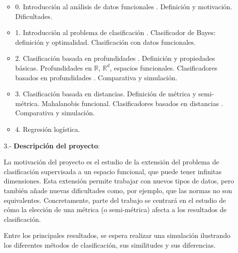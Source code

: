 \documentclass[a4paper,oneside,11pt,leqno]{article}
\begin{document}
\begin{enumerate}
            \begin{itemize}
                  \item 0. Introducción al análisis de datos funcionales \cite{Ramsay-Silverman,Ferraty-Vieu,Cuevas}.
                         Definición y motivación.
                         Dificultades.
                  \item 1. Introducción al problema de clasificación \cite{tesis,MFC}.
                         Clasificador de Bayes: definición y optimalidad.
                         Clasificación con datos funcionales.
                  \item 2. Clasificación basada en profundidades \cite{depth-classification}.
                         Definición y propiedades básicas.
                         Profundidades en $\mathbb{R}$, $\mathbb{R}^d$, espacios funcionales.
                         Clasificadores basados en profundidades \cite{maximum-depth,DD-classifier,DDG-classifier}.
                         Comparativa y simulación.
                  \item 3. Clasificación basada en distancias.
                         Definición de métrica y semi-métrica.
                         Mahalanobis funcional.
                         Clasificadores basados en distancias \cite{trimmed-means}.
                         Comparativa y simulación.
                  \item 4. Regresión logística.
            \end{itemize}

      \item[3.-] {\bf Descripción del proyecto}:

            La motivación del proyecto es el estudio de la extensión del problema de clasificación supervisada a
            un espacio funcional, que puede tener infinitas dimensiones. Esta extensión permite trabajar con nuevos tipos de
            datos, pero también añade nuevas dificultades como, por ejemplo, que las normas no son equivalentes. Concretamente,
            parte del trabajo se centrará en el estudio de cómo la elección de una métrica (o semi-métrica) afecta
            a los resultados de clasificación.

            Entre los principales resultados, se espera realizar una simulación ilustrando los diferentes
            métodos de clasificación, sus similitudes y sus diferencias.


\end{enumerate}
\end{document}
